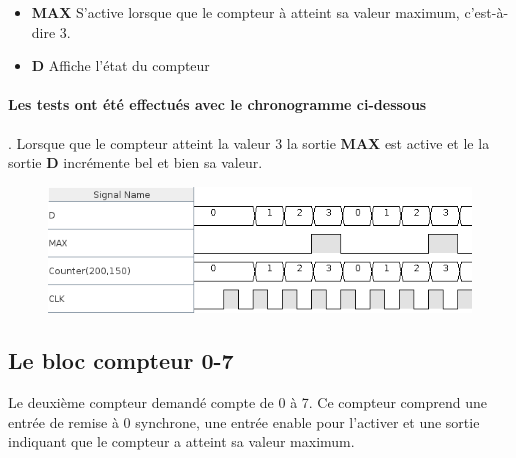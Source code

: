 \documentclass[a4paper]{article} %
\begin{document}
\begin{tcolorbox}[colframe=Monokaimagenta,colback=white]
\begin{itemize}
    \item     \textbf{MAX} S'active lorsque que le compteur à atteint sa valeur maximum, c'est-à-dire 3.
    \item     \textbf{D} Affiche l'état du compteur
\end{itemize}



\paragraph{Les tests ont été effectués avec le chronogramme ci-dessous}. Lorsque que le compteur atteint la valeur $3$ la sortie \textbf{MAX} est active et le la sortie \textbf{D} incrémente bel et bien sa valeur.

\begin{figure}[H]
\centering
    \includegraphics[width=1\textwidth]{src/chrono_COUNT_4.png}
    \label{fig:count4bits}
\end{figure}

\end{tcolorbox}
\subsection{Le bloc compteur 0-7}
Le deuxième compteur demandé compte de 0 à 7. Ce compteur comprend une entrée de remise à 0 synchrone, une entrée enable pour l’activer et une sortie indiquant que le compteur a atteint sa valeur maximum.
\end{document}
